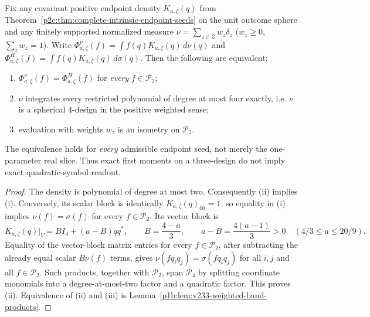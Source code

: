 \documentclass[11pt,a4paper]{article}
\begin{document}
\begin{theorem}
\label{p2c:thm:v268-endpoint-quadratic-iff-design4}
Fix any covariant positive endpoint density $K_{a,\zeta}(q)$ from
Theorem~\ref{p2c:thm:complete-intrinsic-endpoint-seeds} on the unit
outcome sphere and any finitely supported normalized measure
$\nu=\sum_{z\in Z}w_z\delta_z$ ($w_z\ge0$,
$\sum_zw_z=1$).  Write
$\Phi_{a,\zeta}^{\nu}(f)=\int f(q)K_{a,\zeta}(q)\,d\nu(q)$ and
$\Phi_{a,\zeta}^{H}(f)=\int f(q)K_{a,\zeta}(q)\,d\sigma(q)$.
Then the following are equivalent:
\begin{enumerate}[label=(\roman*),leftmargin=2em]
\item $\Phi_{a,\zeta}^{\nu}(f)=\Phi_{a,\zeta}^{H}(f)$ for
      \emph{every} $f\in\mathcal P_2$;
\item $\nu$ integrates every restricted polynomial of degree at most
      four exactly, i.e. $\nu$ is a spherical $4$-design in the
      positive weighted sense;
\item evaluation with weights $w_z$ is an isometry on
      $\mathcal P_2$.
\end{enumerate}
The equivalence holds for \emph{every} admissible endpoint seed,
not merely the one-parameter real slice.  Thus exact first moments
on a three-design do not imply exact quadratic-symbol readout.
\end{theorem}
\begin{proof}
The density is polynomial of degree at most two.  Consequently
(ii) implies (i).  Conversely, its scalar block is identically
$K_{a,\zeta}(q)_{00}=1$, so equality in (i) implies
$\nu(f)=\sigma(f)$ for every $f\in\mathcal P_2$.
Its vector block is
\[
 K_{a,\zeta}(q)|_V=B I_4+(a-B)qq^*,
 \qquad B=\frac{4-a}{3},\qquad
 a-B=\frac{4(a-1)}3>0
 \quad(4/3\le a\le20/9).
\]
Equality of the vector-block matrix entries for every $f\in\mathcal P_2$,
after subtracting the already equal scalar $B\nu(f)$ terms, gives
$\nu(fq_iq_j)=\sigma(fq_iq_j)$ for all $i,j$ and all $f\in\mathcal P_2$.
Such products, together with $\mathcal P_2$, span $\mathcal P_4$
by splitting coordinate monomials into a degree-at-most-two factor
and a quadratic factor.  This proves (ii).  Equivalence of (ii) and
(iii) is Lemma~\ref{p1b:lem:v233-weighted-band-products}.
\end{proof}
\end{document}
